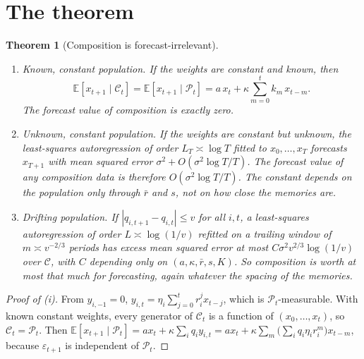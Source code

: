 \documentclass[11pt]{article}
\newtheorem{theorem}{Theorem}\newtheorem{proposition}[theorem]{Proposition}\newtheorem{corollary}[theorem]{Corollary}
\theoremstyle{remark}\newtheorem{remark}[theorem]{Remark}
\begin{document}
\section{The theorem}
\begin{theorem}[Composition is forecast-irrelevant]\label{thm:irr}
\begin{enumerate}[label=(\roman*),itemsep=2pt]
\item \emph{Known, constant population.} If the weights are constant and known, then
\[ \mathbb E[x_{t+1}\mid\mathcal C_t]=\mathbb E[x_{t+1}\mid\mathcal P_t]=a\,x_t+\kappa\sum_{m=0}^{t}k_m\,x_{t-m}. \]
The forecast value of composition is exactly zero.
\item \emph{Unknown, constant population.} If the weights are constant but unknown, the least-squares autoregression of order $L_T\asymp\log T$ fitted to $x_0,\dots,x_T$ forecasts $x_{T+1}$ with mean squared error $\sigma^2+O(\sigma^2\log T/T)$. The forecast value of any composition data is therefore $O(\sigma^2\log T/T)$. The constant depends on the population only through $\bar r$ and $s$, not on how close the memories are.
\item \emph{Drifting population.} If $|q_{i,t+1}-q_{i,t}|\le v$ for all $i,t$, a least-squares autoregression of order $L\asymp\log(1/v)$ refitted on a trailing window of $m\asymp v^{-2/3}$ periods has excess mean squared error at most $C\sigma^2 v^{2/3}\log(1/v)$ over $\mathcal C$, with $C$ depending only on $(a,\kappa,\bar r,s,K)$. So composition is worth at most that much for forecasting, again whatever the spacing of the memories.
\end{enumerate}
\end{theorem}

\begin{proof}[Proof of (i)]
From $y_{i,-1}=0$, $y_{i,t}=\eta_i\sum_{j=0}^{t}r_i^jx_{t-j}$, which is $\mathcal P_t$-measurable. With known constant weights, every generator of $\mathcal C_t$ is a function of $(x_0,\dots,x_t)$, so $\mathcal C_t=\mathcal P_t$. Then $\mathbb E[x_{t+1}\mid\mathcal P_t]=a x_t+\kappa\sum_iq_iy_{i,t}=a x_t+\kappa\sum_m\big(\sum_i q_i\eta_ir_i^m\big)x_{t-m}$, because $\varepsilon_{t+1}$ is independent of $\mathcal P_t$.
\end{proof}
\end{document}
